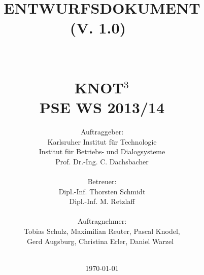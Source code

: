 \documentclass{report}
\begin{document}
\title{\textbf{\Huge{ENTWURFSDOKUMENT}}\\\Large{(V. 1.0)}~\\~\\~\\
		\textbf{\Large{KNOT$^3$}}\\
		PSE WS 2013/14}
\author{\Large{Auftraggeber:}\\
        \Large{Karlsruher Institut für Technologie}\\
        \Large{Institut für Betriebs- und Dialogsysteme}\\
        \Large{Prof. Dr.-Ing. C. Dachsbacher}\\~\\
        \Large{Betreuer:}\\
        \Large{Dipl.-Inf. Thorsten Schmidt}\\
        \Large{Dipl.-Inf. M. Retzlaff}\\~\\
        \Large{Auftragnehmer:}\\
        \Large{Tobias Schulz, Maximilian Reuter, Pascal                    Knodel,}\\
	 	\Large{Gerd Augsburg, Christina Erler, Daniel Warzel}~\\~\\}
\date{\today}

\maketitle

\tableofcontents








\end{document}
